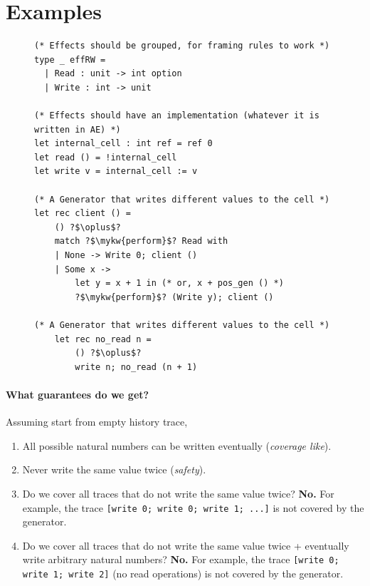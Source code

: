 \section{Examples}

\begin{figure}[ht!]
    \begin{verbatim}
(* Effects should be grouped, for framing rules to work *)
type _ effRW = 
  | Read : unit -> int option
  | Write : int -> unit

(* Effects should have an implementation (whatever it is written in AE) *)
let internal_cell : int ref = ref 0
let read () = !internal_cell
let write v = internal_cell := v

(* A Generator that writes different values to the cell *)
let rec client () =
    () ?$\oplus$?
    match ?$\mykw{perform}$? Read with
    | None -> Write 0; client ()
    | Some x ->
        let y = x + 1 in (* or, x + pos_gen () *)
        ?$\mykw{perform}$? (Write y); client ()

(* A Generator that writes different values to the cell *)
    let rec no_read n =
        () ?$\oplus$?
        write n; no_read (n + 1)
\end{verbatim}
\end{figure}

\paragraph{What guarantees do we get?} Assuming start from empty history trace,
    \begin{enumerate}
        \item \checkmark All possible natural numbers can be written eventually (\emph{coverage like}).
        \item \checkmark Never write the same value twice (\emph{safety}).
        \item \xmark Do we cover all traces that do not write the same value twice? \textbf{No.} For example, the trace \texttt{[write 0; write 0; write 1; ...]} is not covered by the generator.
        \item \xmark Do we cover all traces that do not write the same value twice + eventually write arbitrary natural numbers? \textbf{No.} For example, the trace \texttt{[write 0; write 1; write 2]} (no read operations) is not covered by the generator.
    \end{enumerate}

